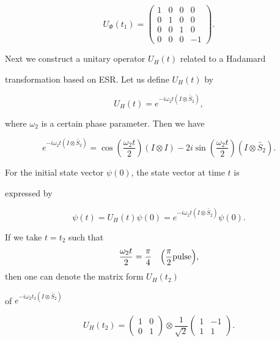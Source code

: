 \[

U_{\Phi }(t_{1})=\left( 

\begin{array}{cccc}

1 & 0 & 0 & 0 \\ 

0 & 1 & 0 & 0 \\ 

0 & 0 & 1 & 0 \\ 

0 & 0 & 0 & -1%

\end{array}%

\right) .

\]%

Next we construct a unitary operator $U_{H}(t)$ related to a Hadamard

transformation based on ESR. Let us define $U_{H}(t)$ by 

\[

U_{H}(t)=e^{-i\omega _{2}t(I\otimes \tilde{S_{2}})}, 

\]%

where $\omega _{2}$ is a certain phase parameter. Then we have 

\[

e^{-i\omega _{2}t(I\otimes \tilde{S_{2}})}=\cos(\frac{\omega _{2}t}{2}%

)(I\otimes I)-2i \sin(\frac{\omega _{2}t}{2})(I\otimes \tilde{S_{2}}). 

\]%

For the initial state vector $\psi (0)$, the state vector at time $t$ is

expressed by 

\[

\psi (t)=U_{H}(t)\psi (0)=e^{-i\omega _{2}t(I\otimes \tilde{S_{2}})}\psi

(0). 

\]%

If we take $t=t_{2}$ such that $$\frac{\omega _{2}t}{2}=\frac{\pi }{4} \quad  \Bigl(\frac{%

\pi }{2}\mbox{pulse}\Bigr),$$ then one can denote the matrix form $U_{H}(t_{2})$

of $e^{-i\omega _{2}t_{2}(I\otimes \tilde{S_{2}})}$ 

\[

U_{H}(t_{2})=\left( 

\begin{array}{cc}

1 & 0 \\ 

0 & 1%

\end{array}%

\right) \otimes \frac{1}{\sqrt{2}}\left( 

\begin{array}{cc}

1 & -1 \\ 

1 & 1%

\end{array}%

\right) .

\]%

